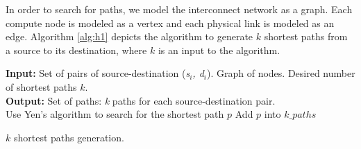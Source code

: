 In order to search for paths, we model the interconnect network as a graph. Each compute node is modeled as a vertex and each physical link is modeled as an edge. Algorithm \ref{alg:h1} depicts the algorithm to generate $k$ shortest paths from a source to its destination, where $k$ is an input to the algorithm.
\begin{algorithm}[!htbp]
\textbf{Input:} Set of pairs of source-destination (\textit{s$_i$, d$_i$}). Graph of nodes. Desired number of shortest paths $k$.\\
\textbf{Output:} Set of paths: \textit{k} paths for each source-destination pair.\\
{ 
	{ 
 		Use Yen's algorithm to search for the shortest path $p$\;
  	Add $p$ into $k\_paths$\;
	}
}	
\caption{$k$ shortest paths generation.}
\label{alg:h1}
\end{algorithm}



